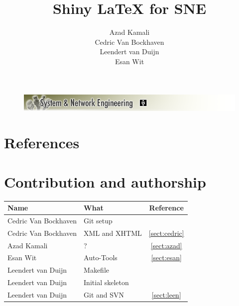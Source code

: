 \documentclass[a4paper,11pt] {article}
\title{Shiny \LaTeX{} for SNE\vspace{10pt}}
\author{
Azad Kamali\\
Cedric Van Bockhaven\\
Leendert van Duijn\\
Esan Wit\\
\vspace{10pt}
}
\begin{document}
\begin{titlepage}
	\enlargethispage{10cm}
	\begin{figure}[h]
	\includegraphics[width=1.0\textwidth]{images/SNELogo.png}
	\end{figure}
	{\let\newpage\relax\maketitle}
\end{titlepage}

\tableofcontents
\newpage






\appendix
\section{References}



\section{Contribution and authorship}
\begin{tabular}{|l | l| c|}
\hline
Name& What&Reference\\
\hline

Cedric Van Bockhaven& Git setup&\\
Cedric Van Bockhaven&XML and XHTML&\ref{sect:cedric}\\
\hline
Azad Kamali& ? &\ref{sect:azad}\\
\hline
Esan Wit&Auto-Tools&\ref{sect:esan}\\
\hline
Leendert van Duijn& Makefile&\\
Leendert van Duijn& Initial skeleton&\\
Leendert van Duijn& Git and SVN&\ref{sect:leen}\\
\hline
\end{tabular}
\end{document}
